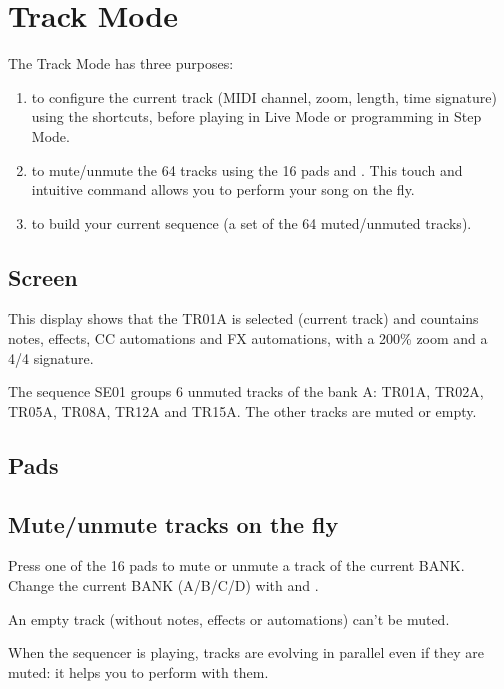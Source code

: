 \chapter{Track Mode}

The Track Mode has three purposes:

\begin{enumerate}
\item to configure the current track (MIDI channel, zoom, length, time signature) using the shortcuts, before playing in Live Mode or programming in Step Mode.
\item to mute/unmute the 64 tracks using the 16 pads and \btn{<} \btn{>}. This touch and intuitive command allows you to perform your song on the fly.
\item to build your current sequence (a set of the 64 muted/unmuted tracks).
\end{enumerate}


\section{Screen}


This display shows that the TR01A is selected (current track) and countains notes, effects, CC automations and FX automations, with a 200\% zoom and a 4/4 signature.

The sequence SE01 groups 6 unmuted tracks of the bank A: TR01A, TR02A, TR05A, TR08A, TR12A and TR15A. The other tracks are muted or empty.


\section{Pads}



\section{Mute/unmute tracks on the fly}

Press one of the 16 pads \stepbystepicon{} to mute or unmute a track of the current BANK. Change the current BANK (A/B/C/D) with \btn{<} and \btn{>}.

An empty track (without notes, effects or automations) can't be muted.

When the sequencer is playing, tracks are evolving in parallel even if they are muted: it helps you to perform with them.

